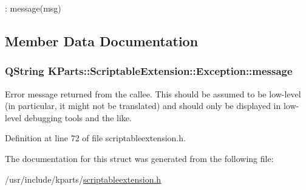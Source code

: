 \begin{DoxyCode}
: message(msg) {}
\end{DoxyCode}


\subsection{\-Member \-Data \-Documentation}
\hypertarget{structKParts_1_1ScriptableExtension_1_1Exception_aa077475854a1ee79ac8905a2e07be407}{
\subsubsection[{message}]{\setlength{\rightskip}{0pt plus 5cm}\-Q\-String {\bf \-K\-Parts\-::\-Scriptable\-Extension\-::\-Exception\-::message}}}\label{structKParts_1_1ScriptableExtension_1_1Exception_aa077475854a1ee79ac8905a2e07be407}
\-Error message returned from the callee. \-This should be assumed to be low-\/level (in particular, it might not be translated) and should only be displayed in low-\/level debugging tools and the like. 

\-Definition at line 72 of file scriptableextension.\-h.



\-The documentation for this struct was generated from the following file\-:\begin{DoxyCompactItemize}
\item 
/usr/include/kparts/\hyperlink{scriptableextension_8h}{scriptableextension.\-h}\end{DoxyCompactItemize}
